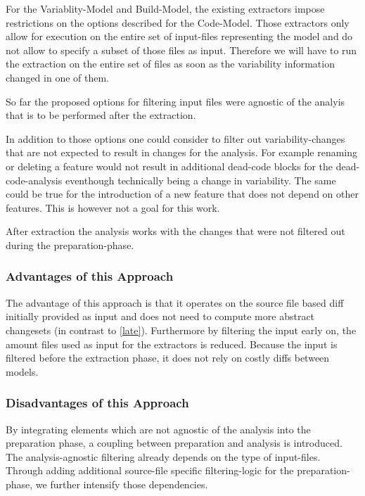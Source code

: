 \documentclass[a4paper]{article}
\begin{document}
For the Variablity-Model and Build-Model, the existing extractors impose restrictions on the options described for the Code-Model. Those extractors only allow for execution on the entire set of input-files representing the model and do not allow to specify a subset of those files as input. Therefore we will have to run the extraction on the entire set of files as soon as the variability information changed in one of them.

So far the proposed options for filtering input files were agnostic of the analyis that is to be performed after the extraction.

In addition to those options one could consider to filter out variability-changes that are not expected to result in changes for the analysis. For example renaming or deleting a feature would not result in additional dead-code blocks for the dead-code-analysis eventhough technically being a change in variability. The same could be true for the introduction of a new feature that does not depend on other features. This is however not a goal for this work.

After extraction the analysis works with the changes that were not filtered out during the preparation-phase.

\subsubsection{Advantages of this Approach}

The advantage of this approach is that it operates on the source file based diff initially provided as input and does not need to compute more abstract changesets (in contrast to \autoref{late}). Furthermore by filtering the input early on, the amount files used as input for the extractors is reduced. Because the input is filtered before the extraction phase, it does not rely on costly diffs between models.

\subsubsection{Disadvantages of this Approach}

By integrating elements which are not agnostic of the analysis into the preparation phase, a coupling between preparation and analysis is introduced. The analysis-agnostic filtering already depends on the type of input-files. Through adding additional source-file specific filtering-logic for the preparation-phase, we further intensify those dependencies.
\end{document}

